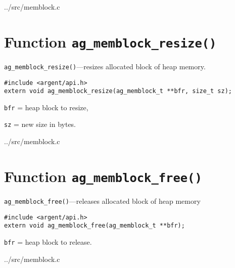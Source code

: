 \lstset{style=CODE}

  {../src/memblock.c}


%


\section{Function \texttt{ag\_memblock\_resize()}}

\begin{noteblock}
\small
\verb|ag_memblock_resize()|---resizes allocated block of heap memory.
\lstset{style=SYNOPSIS}
\begin{lstlisting}[linewidth=1.0\linewidth]
#include <argent/api.h>
extern void ag_memblock_resize(ag_memblock_t **bfr, size_t sz);
\end{lstlisting}
\verb|bfr| = heap block to resize, \par
\verb|sz| = new size in bytes.
\end{noteblock}

\lstset{style=CODE}

  {../src/memblock.c}



%


\section{Function \texttt{ag\_memblock\_free()}}

\begin{noteblock}
\small
\verb|ag_memblock_free()|---releases allocated block of heap memory
\lstset{style=SYNOPSIS}
\begin{lstlisting}
#include <argent/api.h>
extern void ag_memblock_free(ag_memblock_t **bfr);
\end{lstlisting}
\verb|bfr| = heap block to release.
\end{noteblock}

\lstset{style=CODE}

  {../src/memblock.c}
